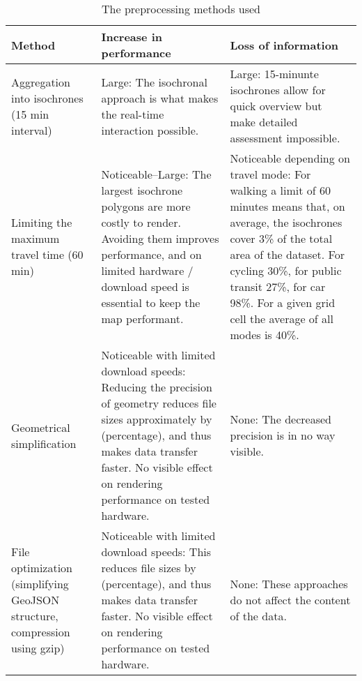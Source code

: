 \begin{table}[H]
	\caption{The preprocessing methods used}
	\label{tab:preprocessing methods}
	\centering
	\begin{tabular}{ | L{0.2\textwidth} | L{0.35\textwidth} | L{0.35\textwidth} | }
		\hline
		Method
		& Increase in performance
		& Loss of information
		\\
		\hline
		\hline
		Aggregation into isochrones (15 min interval)
		& Large: The isochronal approach is what makes the real-time interaction possible.
		& Large: 15-minunte isochrones allow for quick overview but make detailed assessment impossible.
		\\
		\hline
		Limiting the maximum travel time (60 min)
		& Noticeable--Large: The largest isochrone polygons are more costly to render.
		Avoiding them improves performance, and on limited hardware / download speed
		is essential to keep the map performant.
		& Noticeable depending on travel mode:
		For walking a limit of 60 minutes means that, on average,
		the isochrones cover 3\% of the total area of the dataset.
		For cycling 30\%, for public transit 27\%, for car 98\%.
		For a given grid cell the average of all modes is 40\%.
		\\
		\hline
		Geometrical simplification
		& Noticeable with limited download speeds:
		Reducing the precision of geometry reduces file sizes approximately by (percentage),  %
		and thus makes data transfer faster.
		No visible effect on rendering performance on tested hardware.
		& None: The decreased precision is in no way visible.
		\\
		\hline
		File optimization (simplifying GeoJSON structure, compression using gzip)
		& Noticeable with limited download speeds:
		This reduces file sizes by (percentage),  %
		and thus makes data transfer faster.
		No visible effect on rendering performance on tested hardware.
		& None: These approaches do not affect the content of the data.
		\\
		\hline
	\end{tabular}
\end{table}
